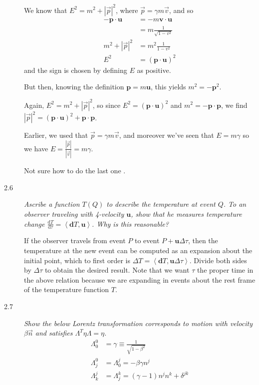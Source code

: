 \documentclass[12pt]{report}
\newcommand{\rd}[2]{\frac{\mathrm{d}#1}{\mathrm{d}#2}}
\newcommand{\abs}[1]{\left|#1\right|}
\newcommand{\expvalue}[1]{\left<#1\right>}
\begin{document}
\begin{description}
        We know that $E^2 = m^2 + \abs{\vec{p}}^2$, where $\vec{p} = \gamma m
        \vec{v}$, and so
        \begin{align}
            -\mathbf{p} \cdot \mathbf{u} &= -m\mathbf{v} \cdot \mathbf{u}
                \nonumber\\
            &= m\frac{1}{\sqrt{1 - v^2}} \nonumber\\
            m^2 + \abs{\vec{p}}^2 &= m^2\frac{1}{1-v^2} \nonumber\\
            E^2 &= (\mathbf{p} \cdot \mathbf{u})^2
        \end{align}
        and the sign is chosen by defining $E$ as positive.

        But then, knowing the definition $\mathbf{p} = m\mathbf{u}$, this yields
        $m^2 = -\mathbf{p}^2$.

        Again, $E^2 = m^2 + \abs{\vec{p}}^2$, so since
        $E^2 = (\mathbf{p} \cdot \mathbf{u})^2$ and $m^2 = -\mathbf{p} \cdot
        \mathbf{p}$, we find
        $\abs{\vec{p}}^2 = (\mathbf{p} \cdot \mathbf{u})^2 + \mathbf{p} \cdot
        \mathbf{p}$.

        Earlier, we used that $\vec{p} = \gamma m \vec{v}$, and moreover we've
        seen that $E = m\gamma$ so we have $E =
        \frac{\abs{\vec{p}}}{\abs{\vec{v}}} = m\gamma$.

        Not sure how to do the last one \frownie.

    \item[2.6] \emph{Ascribe a function $T(Q)$ to describe the temperature at
        event $Q$. To an observer traveling with 4-velocity $\mathbf{u}$, show
        that he measures temperature change $\rd{T}{\tau} =
        \expvalue{\mathbf{d}T, \mathbf{u}}$. Why is this reasonable?}

        If the observer travels from event $P$ to event $P +
        \mathbf{u}\Delta\tau$, then the temperature at the new event can be
        computed as an expansion about the initial point, which to first order
        is $\Delta T = \expvalue{\mathbf{d}T, \mathbf{u}\Delta \tau}$. Divide
        both sides by $\Delta \tau$ to obtain the desired result. Note that we
        want $\tau$ the proper time in the above relation because we are
        expanding in events about the rest frame of the temperature function
        $T$.

    \item[2.7] \emph{Show the below Lorentz transformation corresponds to motion
        with velocity $\beta \vec{n}$ and satisfies $\Lambda^T\eta \Lambda =
        \eta$.}
        \begin{align}
            \Lambda^0_0 &= \gamma \equiv \frac{1}{\sqrt{1 - \beta^2}}\\
            \Lambda^0_j &= \Lambda^j_0 = -\beta\gamma n^j\\
            \Lambda^j_k &= \Lambda^k_j = (\gamma - 1)n^jn^k + \delta^{jk}
        \end{align}
\end{description}
\end{document}
